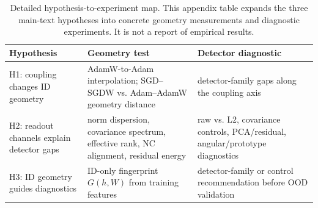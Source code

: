 \begin{table}[t]
\caption{Detailed hypothesis-to-experiment map. This appendix table expands the
three main-text hypotheses into concrete geometry measurements and diagnostic
experiments. It is not a report of empirical results.}
\label{tab:theory-prediction-map}
\begin{center}
\footnotesize
\setlength{\tabcolsep}{4pt}
\renewcommand{\arraystretch}{1.15}
\begin{tabular}{@{}p{}p{}p{}@{}}
\toprule
Hypothesis & Geometry test & Detector diagnostic \\
\midrule
H1: coupling changes ID geometry
& AdamW-to-Adam interpolation; SGD--SGDW vs. Adam--AdamW geometry distance
& detector-family gaps along the coupling axis \\
H2: readout channels explain detector gaps
& norm dispersion, covariance spectrum, effective rank, NC alignment, residual energy
& raw vs. L2, covariance controls, PCA/residual, angular/prototype diagnostics \\
H3: ID geometry guides diagnostics
& ID-only fingerprint \(G(h,W)\) from training features
& detector-family or control recommendation before OOD validation \\
\bottomrule
\end{tabular}
\end{center}
\end{table}
